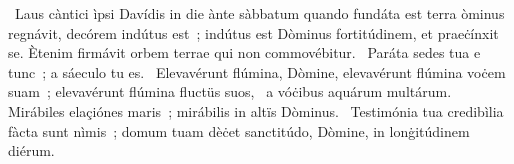 {~Laus càntici ìpsi Davídis in die ànte sàbbatum quando fundáta est terra}
{%
òminus regnávit, decórem indútus est~; indútus est Dòminus fortitúdinem, et praeċínxit se. Ètenim firmávit orbem terrae qui non commovébitur.
~Paráta sedes tua e tunc~; a sáeculo tu es.
~Elevavérunt flúmina, Dòmine, elevavérunt flúmina voċem suam~; elevavérunt flúmina fluctüs suos,
~a vóċibus aquárum multárum. Mirábiles elaçiónes maris~; mirábilis in altïs Dòminus.
~Testimónia tua credibìlia fàcta sunt nìmis~; domum tuam dèċet sanctitúdo, Dòmine, in lonġitúdinem diérum.
}
